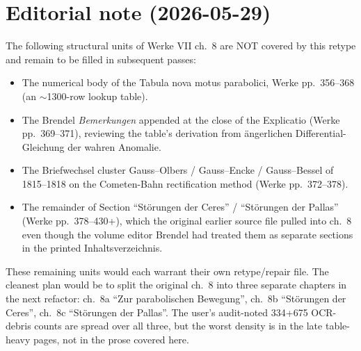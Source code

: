 \documentclass[11pt,a4paper]{article}
\begin{document}
\bigskip


\section*{Editorial note (2026-05-29)}

The following structural units of Werke VII ch.~8 are NOT covered by
this retype and remain to be filled in subsequent passes:
\begin{itemize}
  \item[(a)] The numerical body of the Tabula nova motus parabolici,
        Werke pp.~356--368 (an $\sim$1300-row lookup table).
  \item[(b)] The Brendel \textit{Bemerkungen} appended at the close of
        the Explicatio (Werke pp.~369--371), reviewing the table's
        derivation from \"angerlichen Differential-Gleichung der
        wahren Anomalie.
  \item[(c)] The Briefwechsel cluster Gauss--Olbers / Gauss--Encke /
        Gauss--Bessel of 1815--1818 on the Cometen-Bahn rectification
        method (Werke pp.~372--378).
  \item[(d)] The remainder of Section ``St\"orungen der Ceres'' /
        ``St\"orungen der Pallas'' (Werke pp.~378--430+), which the
        original earlier source file pulled into ch.~8 even though the volume
        editor Brendel had treated them as separate sections in the
        printed Inhaltsverzeichnis.
\end{itemize}

These remaining units would each warrant their own retype/repair
file. The cleanest plan would be to split the original ch.~8 into
three separate chapters in the next refactor:
ch.~8a ``Zur parabolischen Bewegung'', ch.~8b ``St\"orungen der Ceres'',
ch.~8c ``St\"orungen der Pallas''. The user's audit-noted
334+675 OCR-debris counts are spread over all three, but the worst
density is in the late table-heavy pages, not in the prose covered
here.
\end{document}
